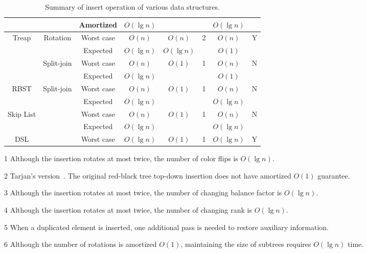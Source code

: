 \begin{table}[!t]
\begin{threeparttable}
\begin{tabular}{cccccccc}
  & & Amortized & $O(\lg n)$ & & & $O(\lg n)$ & \\
  \hline
  \multirow{4}{*}{Treap} & \multirow{2}{*}{Rotation} & Worst case & $O(n)$ & $O(n)$ & \multirow{2}{*}{2} & $O(n)$ & \multirow{2}{*}{Y} \\
  & & Expected & $O(\lg n)$ & $O(\lg n)$ & & $O(1)$ & \\
  & \multirow{2}{*}{Split-join} & Worst case & $O(n)$ & \multirow{2}{*}{$O(1)$} & \multirow{2}{*}{1} & $O(n)$ & \multirow{2}{*}{N\tnote{5}} \\
  & & Expected & $O(\lg n)$ & & & $O(1)$ & \\
  \hline
  \multirow{2}{*}{RBST} & \multirow{2}{*}{Split-join}& Worst case & $O(n)$ & \multirow{2}{*}{$O(1)$} & \multirow{2}{*}{1} & $O(n)$ & \multirow{2}{*}{N\tnote{5}} \\
  & & Expected & $O(\lg n)$ &  & & $O(\lg n)$ & \\
  \hline
  \multirow{2}{*}{Skip List} & & Worst case & $O(n)$ & \multirow{2}{*}{$O(1)$} & \multirow{2}{*}{1} & $O(n)$ & \multirow{2}{*}{N\tnote{5}} \\
  & & Expected & $O(\lg n)$ & & & $O(\lg n)$ & \\
  \hline
  DSL & & Worst case & $O(\lg n)$ & $O(1)$ & 1 & $O(\lg n)$ & Y \\
\end{tabular}
\begin{tablenotes}\footnotesize
\item[1] Although the insertion rotates at most twice, the number of color flips is $O(\lg n)$.
\item[2] Tarjan's version~\cite{Tarjan1985}. The original red-black tree top-down insertion does not have amortized $O(1)$ guarantee.
\item[3] Although the insertion rotates at most twice, the number of changing balance factor is $O(\lg n)$.
\item[4] Although the insertion rotates at most twice, the number of changing rank is $O(\lg n)$.
\item[5] When a duplicated element is inserted, one additional pass is needed to restore auxiliary information.
\item[6] Although the number of rotations is amortized $O(1)$, maintaining the size of subtrees requires $O(\lg n)$ time.
\end{tablenotes}
\caption{Summary of insert operation of various data structures.}\label{insert}
\end{threeparttable}
\end{table}

